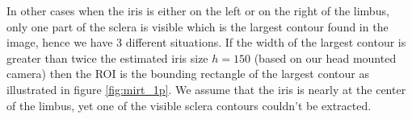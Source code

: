 \begin{figure}[h]
\end{figure}

In other cases when the iris is either on the left or on the right of the limbus, only one part of the sclera is visible which is the largest contour found in the image, hence we have 3 different situations. If the width of the largest contour is greater than twice the estimated iris size $ h = 150 $ (based on our head mounted camera) then the ROI is the bounding rectangle of the largest contour as illustrated in figure \ref{fig:mirt_1p}. We assume that the iris is nearly at the center of the limbus, yet one of the visible sclera contours couldn't be extracted. \bigskip

